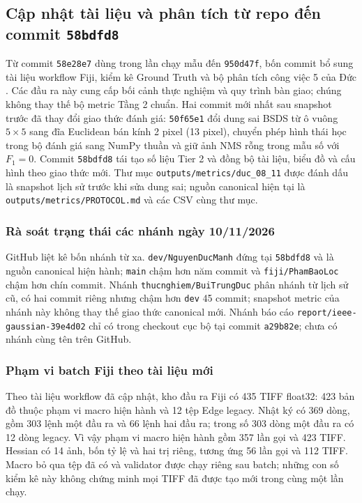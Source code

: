 \subsection{Cập nhật tài liệu và phân tích từ repo đến commit \texttt{58bdfd8}}
\label{sec:repo-update}
Từ commit \texttt{58e28e7} dùng trong lần chạy mẫu đến \texttt{950d47f},
bốn commit bổ sung tài liệu workflow Fiji, kiểm kê Ground Truth và bộ
phân tích công việc 5 của Đức \cite{xlaUpdate950}. Các đầu ra này cung cấp
bối cảnh thực nghiệm và quy trình bàn giao; chúng không thay thế bộ metric
Tầng 2 chuẩn. Hai commit mới nhất sau snapshot trước đã thay đổi giao thức
đánh giá: \texttt{50f65e1} đổi dung sai BSDS từ ô vuông $5\times5$ sang
đĩa Euclidean bán kính 2 pixel (13 pixel), chuyển phép hình thái học trong
bộ đánh giá sang NumPy thuần và giữ ảnh NMS rỗng trong mẫu số với $F_1=0$.
Commit \texttt{58bdfd8} tái tạo số liệu Tier 2 và đồng bộ tài liệu, biểu đồ
và cấu hình theo giao thức mới. Thư mục \texttt{outputs/metrics/duc\_08\_11}
được đánh dấu là snapshot lịch sử trước khi sửa dung sai; nguồn canonical
hiện tại là \texttt{outputs/metrics/PROTOCOL.md} và các CSV cùng thư mục.

\subsubsection{Rà soát trạng thái các nhánh ngày 10/11/2026}
GitHub liệt kê bốn nhánh từ xa. \texttt{dev/NguyenDucManh} đứng tại
\texttt{58bdfd8} và là nguồn canonical hiện hành; \texttt{main} chậm hơn
năm commit và \texttt{fiji/PhamBaoLoc} chậm hơn chín commit. Nhánh
\texttt{thucnghiem/BuiTrungDuc} phân nhánh từ lịch sử cũ, có hai commit
riêng nhưng chậm hơn \texttt{dev} 45 commit; snapshot metric của nhánh này
không thay thế giao thức canonical mới. Nhánh báo cáo
\texttt{report/ieee-gaussian-39e4d02} chỉ có trong checkout cục bộ tại
commit \texttt{a29b82e}; chưa có nhánh cùng tên trên GitHub.

\subsubsection{Phạm vi batch Fiji theo tài liệu mới}
Theo tài liệu workflow đã cập nhật, kho đầu ra Fiji có 435 TIFF float32:
423 bản đồ thuộc phạm vi macro hiện hành và 12 tệp Edge legacy. Nhật ký
có 369 dòng, gồm 303 lệnh một đầu ra và 66 lệnh hai đầu ra; trong số
303 dòng một đầu ra có 12 dòng legacy. Vì vậy phạm vi macro hiện hành
gồm 357 lần gọi và 423 TIFF. Hessian có 14 ảnh, bốn tỷ lệ và hai trị riêng,
tương ứng 56 lần gọi và 112 TIFF. Macro bỏ qua tệp đã có và validator được
chạy riêng sau batch; những con số kiểm kê này không chứng minh mọi TIFF
đã được tạo mới trong cùng một lần chạy.

